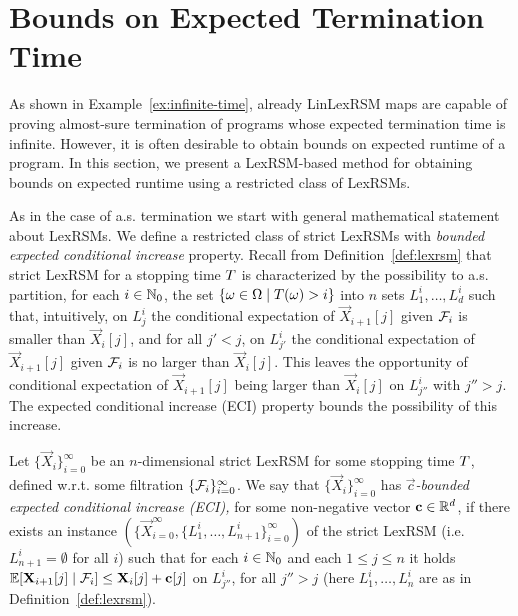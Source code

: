 \section{Bounds on Expected Termination Time}

As shown in Example~\ref{ex:infinite-time}, already LinLexRSM maps are capable 
of proving almost-sure termination of programs whose expected termination time 
is infinite. However, it is often desirable to obtain bounds on expected 
runtime of a program. In this section, we present a LexRSM-based method for 
obtaining bounds on expected runtime using a restricted class of LexRSMs.

As in the case of a.s. termination we start with general mathematical statement 
about LexRSMs. We define a restricted class of strict LexRSMs with \emph{bounded 
expected conditional increase} property. Recall from 
Definition~\ref{def:lexrsm} that strict
LexRSM for a stopping time $T$ is characterized by the possibility to 
a.s. partition, for each $i\in \mathbb{N}_0$, the set $\{\omega\in \Omega\mid 
T(\omega)>i \}$ into $n$ sets $L^i_1,\dots,L^i_d$ such that, intuitively, 
on $L^i_j$ the conditional expectation of $\vec{X}_{i+1}[j]$ given $\mathcal{F}_i$ 
is smaller than $\vec{X}_i[j]$, and for all $j'<j$, on $L^i_{j'}$ the 
conditional expectation of $\vec{X}_{i+1}[j]$ given $\mathcal{F}_i$ 
is no larger than $\vec{X}_i[j]$. This leaves the opportunity of conditional 
expectation of $\vec{X}_{i+1}[j]$ being larger than $\vec{X}_i[j]$ on 
$L^i_{j''}$ with $j''>j$. The expected conditional increase (ECI) property 
bounds the 
possibility of this increase. 

\begin{definition}
	\label{def:lexrsm-eci}
Let $\{\vec{X}_{i}\}_{i=0}^{\infty}$ be an 
$n$-dimensional strict LexRSM for some stopping time $T$, defined w.r.t. some 
filtration $\{\mathcal{F}_i\}_{i=0}^{\infty}$. We say that 
$\{\vec{X}_{i}\}_{i=0}^{\infty}$ has \emph{$\vec{c}$-bounded expected 
conditional 
increase (ECI),} for 
some non-negative vector $\mathbf{c}\in\mathbb{R}^d$, if there exists an instance $(\{\vec{X}_{i=0}^{\infty},\{L_1^i,\dots,L_{n+1}^i\}_{i=0}^{\infty})$ of the strict LexRSM (i.e. $L^i_{n+1}=\emptyset$ for all $i$) such that for each $i\in \mathbb{N}_0 $ and 
each $1\leq 
j \leq n $ it holds 
$\mathbb{E}[\mathbf{X}_{i+1}[j]\mid \mathcal{F}_i]\leq \mathbf{X}_{i}[j]+\mathbf{c}[j]$ on 
$L^i_{j''}$, 
for all $j''>j$ 
(here $L^i_1,\dots,L^i_n$ are as in Definition~\ref{def:lexrsm}).
\end{definition}

